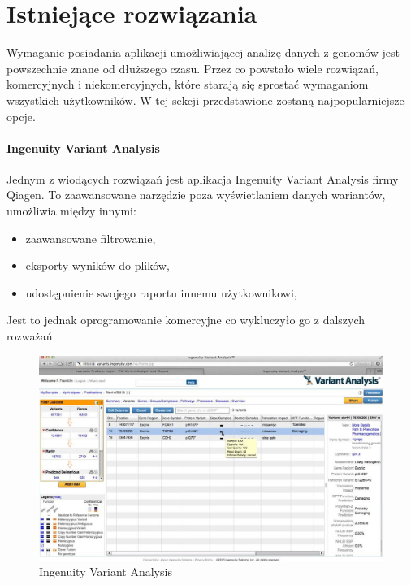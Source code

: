 \documentclass[a4paper,12pt,twoside]{article}
\begin{document}
\newpage
\section{Istniejące rozwiązania}  

Wymaganie posiadania aplikacji umożliwiającej analizę danych z genomów 
jest powszechnie znane od dłuższego czasu. Przez co powstało wiele rozwiązań,
komercyjnych i niekomercyjnych, które starają się sprostać wymaganiom wszystkich użytkowników. W tej sekcji przedstawione zostaną najpopularniejsze opcje.

\paragraph{Ingenuity Variant Analysis} Jednym z wiodących rozwiązań jest aplikacja Ingenuity Variant Analysis \cite{ingenuity} firmy Qiagen. To zaawansowane narzędzie
poza wyświetlaniem danych wariantów, umożliwia między innymi:

\begin{itemize}
\item zaawansowane filtrowanie,
\item eksporty wyników do plików,
\item udostępnienie swojego raportu innemu użytkownikowi,
\end{itemize} 
  
Jest to jednak oprogramowanie komercyjne co wykluczyło go z dalszych 
rozważań.

\begin{figure}[h]
\includegraphics[width=\linewidth]{obrazy/exac/ingenuity.jpg}
  \caption{Ingenuity Variant Analysis \cite{ingenuity}}
  \label{fig:ingenuitypic}
\end{figure}
\newpage
\end{document}
